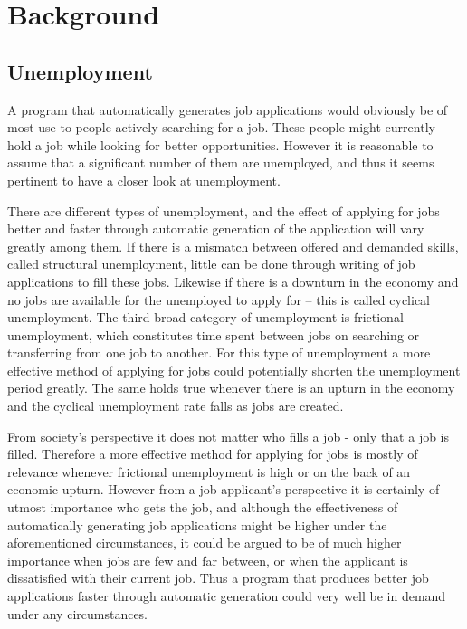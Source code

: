 \section{Background}\label{ch:background}

\subsection{Unemployment}

A program that automatically generates job applications would obviously be of
most use to people actively searching for a job. These people might currently
hold a job while looking for better opportunities. However it is reasonable to
assume that a significant number of them are unemployed, and thus it seems
pertinent to have a closer look at unemployment.

There are different types of unemployment, and the effect of applying for jobs
better and faster through automatic generation of the application will vary
greatly among them.
If there is a mismatch between offered and demanded skills, called structural
unemployment, little can be done through writing of job applications to fill
these jobs.\cite{aumeployment}
Likewise if there is a downturn in the economy and no jobs are available for the
unemployed to apply for -- this is called cyclical unemployment.\cite{aumeployment}
The third broad category of unemployment is frictional unemployment, which
constitutes time spent between jobs on searching or transferring from one job to
another.\cite{aumeployment}
For this type of unemployment a more effective method of applying for jobs could
potentially shorten the unemployment period greatly. The same holds true
whenever there is an upturn in the economy and the cyclical unemployment rate
falls as jobs are created.

From society's perspective it does not matter who fills a job - only that a job
is filled. Therefore a more effective method for applying for jobs is mostly of
relevance whenever frictional unemployment is high or on the back of an economic
upturn.
However from a job applicant's perspective it is certainly of utmost importance
who gets the job, and although the effectiveness of automatically generating job
applications might be higher under the aforementioned circumstances, it could be
argued to be of much higher importance when jobs are few and far between, or
when the applicant is dissatisfied with their current job.
Thus a program that produces better job applications faster through automatic
generation could very well be in demand under any circumstances.

